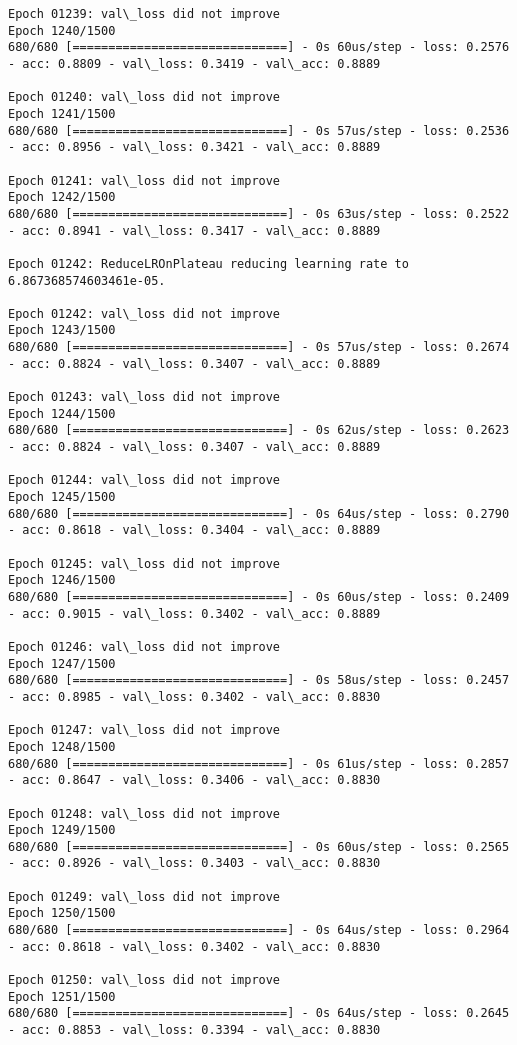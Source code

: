 \documentclass[11pt]{article}
\begin{document}
\begin{Verbatim}[commandchars=\\\{\}]
Epoch 01239: val\_loss did not improve
Epoch 1240/1500
680/680 [==============================] - 0s 60us/step - loss: 0.2576 - acc: 0.8809 - val\_loss: 0.3419 - val\_acc: 0.8889

Epoch 01240: val\_loss did not improve
Epoch 1241/1500
680/680 [==============================] - 0s 57us/step - loss: 0.2536 - acc: 0.8956 - val\_loss: 0.3421 - val\_acc: 0.8889

Epoch 01241: val\_loss did not improve
Epoch 1242/1500
680/680 [==============================] - 0s 63us/step - loss: 0.2522 - acc: 0.8941 - val\_loss: 0.3417 - val\_acc: 0.8889

Epoch 01242: ReduceLROnPlateau reducing learning rate to 6.867368574603461e-05.

Epoch 01242: val\_loss did not improve
Epoch 1243/1500
680/680 [==============================] - 0s 57us/step - loss: 0.2674 - acc: 0.8824 - val\_loss: 0.3407 - val\_acc: 0.8889

Epoch 01243: val\_loss did not improve
Epoch 1244/1500
680/680 [==============================] - 0s 62us/step - loss: 0.2623 - acc: 0.8824 - val\_loss: 0.3407 - val\_acc: 0.8889

Epoch 01244: val\_loss did not improve
Epoch 1245/1500
680/680 [==============================] - 0s 64us/step - loss: 0.2790 - acc: 0.8618 - val\_loss: 0.3404 - val\_acc: 0.8889

Epoch 01245: val\_loss did not improve
Epoch 1246/1500
680/680 [==============================] - 0s 60us/step - loss: 0.2409 - acc: 0.9015 - val\_loss: 0.3402 - val\_acc: 0.8889

Epoch 01246: val\_loss did not improve
Epoch 1247/1500
680/680 [==============================] - 0s 58us/step - loss: 0.2457 - acc: 0.8985 - val\_loss: 0.3402 - val\_acc: 0.8830

Epoch 01247: val\_loss did not improve
Epoch 1248/1500
680/680 [==============================] - 0s 61us/step - loss: 0.2857 - acc: 0.8647 - val\_loss: 0.3406 - val\_acc: 0.8830

Epoch 01248: val\_loss did not improve
Epoch 1249/1500
680/680 [==============================] - 0s 60us/step - loss: 0.2565 - acc: 0.8926 - val\_loss: 0.3403 - val\_acc: 0.8830

Epoch 01249: val\_loss did not improve
Epoch 1250/1500
680/680 [==============================] - 0s 64us/step - loss: 0.2964 - acc: 0.8618 - val\_loss: 0.3402 - val\_acc: 0.8830

Epoch 01250: val\_loss did not improve
Epoch 1251/1500
680/680 [==============================] - 0s 64us/step - loss: 0.2645 - acc: 0.8853 - val\_loss: 0.3394 - val\_acc: 0.8830


\end{Verbatim}
\end{document}
